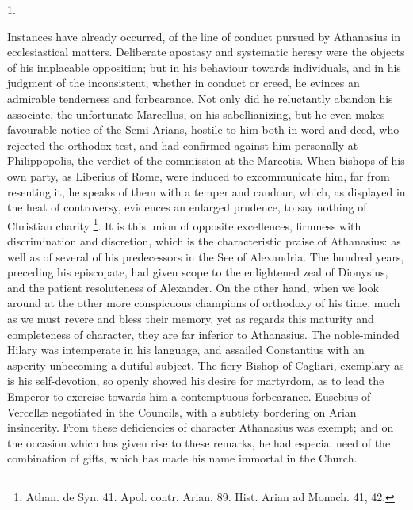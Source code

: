 1.

Instances have already occurred, of the line of conduct pursued by
Athanasius in ecclesiastical matters. Deliberate apostasy and
systematic heresy were the objects of his implacable opposition; but
in his behaviour towards individuals, and in his judgment of the
inconsistent, whether in conduct or creed, he evinces an admirable
tenderness and forbearance. Not only did he reluctantly abandon his
associate, the unfortunate Marcellus, on his sabellianizing, but he
even makes favourable notice of the Semi-Arians, hostile to him both
in word and deed, who rejected the orthodox test, and had confirmed
against him personally at Philippopolis, the verdict of the commission
at the Mareotis. When bishops of his own party, as Liberius of Rome,
were induced to excommunicate him, far from resenting it, he speaks of
them with a temper and candour, which, as displayed in the heat of
controversy, evidences an enlarged prudence, to say nothing of
Christian charity \footnote{Athan. de Syn. 41. Apol. contr. Arian. 89.
Hist. Arian ad Monach. 41, 42.}. It is
this union of opposite excellences, firmness with discrimination and
discretion, which is the characteristic praise of Athanasius: as well
as of several of his predecessors in the See of Alexandria. The
hundred years, preceding his episcopate, had given scope to the
enlightened zeal of Dionysius, and the patient resoluteness of
Alexander. On the other hand, when we look around at the other more
conspicuous champions of orthodoxy of his time, much as we must revere
and bless their memory, yet as regards this maturity and
completeness of character, they are far inferior to Athanasius. The
noble-minded Hilary was intemperate in his language, and assailed
Constantius with an asperity unbecoming a dutiful subject. The fiery
Bishop of Cagliari, exemplary as is his self-devotion, so openly
showed his desire for martyrdom, as to lead the Emperor to exercise
towards him a contemptuous forbearance. Eusebius of Vercellæ
negotiated in the Councils, with a subtlety bordering on Arian
insincerity. From these deficiencies of character Athanasius was
exempt; and on the occasion which has given rise to these remarks, he
had especial need of the combination of gifts, which has made his name
immortal in the Church.


